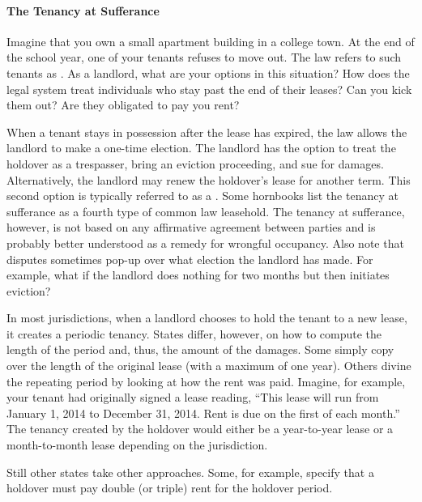 \paragraph{The Tenancy at Sufferance}

Imagine that you own a small apartment building in a college town.  At the
end of the school year, one of your tenants refuses to move out.  The law
refers to such tenants as .  As a landlord,
what are your
options in this situation?  How does the legal system treat individuals who
stay past the end of their leases?  Can you kick them out? Are they obligated
to pay you rent?

When a tenant stays in possession after the lease has expired, the law allows
the landlord to make a one-time election.  The landlord has the option to treat
the holdover as a trespasser, bring an eviction proceeding, and sue for
damages.  Alternatively, the landlord may renew the holdover's lease for
another term.  This second option is typically referred to as a .  Some hornbooks list the tenancy at sufferance as a fourth type
of common law leasehold.  The tenancy at sufferance, however, is not based on
any affirmative agreement between parties and is probably better understood as
a remedy for wrongful occupancy.  Also note that disputes sometimes pop-up over
what election the landlord has made.  For example, what if the landlord does
nothing for two months but then initiates eviction?  

In most jurisdictions, when a landlord chooses to hold the tenant to a new
lease, it creates a periodic tenancy.  States differ, however, on how to
compute the length of the period and, thus, the amount of the damages.  Some
simply copy over the length of the original lease (with a maximum of one year).
Others divine the repeating period by looking at how the rent was paid. 
Imagine, for example, your tenant had originally signed a lease reading, ``This
lease will run from January 1, 2014 to December 31, 2014.  Rent is due on the
first of each month.''  The tenancy created by the holdover would either be a
year-to-year lease or a month-to-month lease depending on the jurisdiction.

Still other states take other approaches.  Some, for example, specify that a
holdover must pay double (or triple) rent for the holdover period.  

